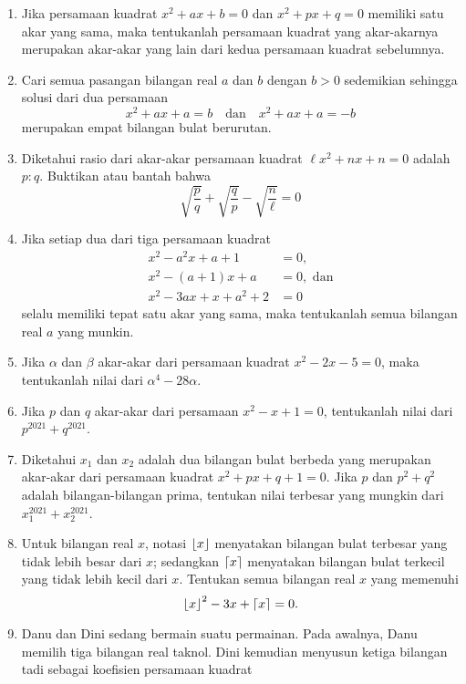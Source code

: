 \begin{enumerate}[nosep]
			\item Jika persamaan kuadrat $ x^{2} + ax + b = 0 $ dan $ x^{2} + px + q = 0 $ memiliki satu akar yang sama, maka tentukanlah persamaan kuadrat yang akar-akarnya merupakan akar-akar yang lain dari kedua persamaan kuadrat sebelumnya.
			\item Cari semua pasangan bilangan real $ a $ dan $ b $ dengan $ b > 0 $ sedemikian sehingga solusi dari dua persamaan
			\[ x^{2} + ax + a = b \quad \mbox{dan} \quad x^{2} + ax + a = -b \]
			merupakan empat bilangan bulat berurutan.
			\item {} Diketahui rasio dari akar-akar persamaan kuadrat $ \ell x^{2} + nx + n = 0 $ adalah $ p : q $. Buktikan atau bantah bahwa
			\[ \sqrt{\frac{p}{q}} + \sqrt{\frac{q}{p}} - \sqrt{\frac{n}{\ell}} = 0 \]
			\item Jika setiap dua dari tiga persamaan kuadrat
			\begin{align*}
				 x^{2} - a^{2}x + a + 1 &= 0, \\
				 x^{2} - \left(a + 1\right)x + a &= 0, \mbox{ dan} \\
				 x^{2} - 3ax + x + a^{2} + 2 &= 0
			\end{align*}
			selalu memiliki tepat satu akar yang sama, maka tentukanlah semua bilangan real $ a $ yang munkin.
			\item Jika $ \alpha $ dan $ \beta $ akar-akar dari persamaan kuadrat $ x^{2} - 2x - 5 = 0 $, maka tentukanlah nilai dari $ \alpha^{4} - 28\alpha $.
			\item Jika $ p $ dan $ q $ akar-akar dari persamaan $ x^{2} - x + 1 = 0 $, tentukanlah nilai dari $ p^{2021} + q^{2021} $.
			\item Diketahui $ x_{1} $ dan $ x_{2} $ adalah dua bilangan bulat berbeda yang merupakan akar-akar dari persamaan kuadrat $ x^{2} + px + q + 1 = 0 $. Jika $ p $ dan $ p^{2} + q^{2} $ adalah bilangan-bilangan prima, tentukan nilai terbesar yang mungkin dari $ x_{1}^{2021} + x_{2}^{2021} $.
			\item \probtype{*} Untuk bilangan real $ x $, notasi $ \mathop{}\!\left\lfloor{x}\right\rfloor $ menyatakan bilangan bulat terbesar yang tidak lebih besar dari $ x $; sedangkan $ \mathop{}\!\left\lceil{x}\right\rceil $ menyatakan bilangan bulat terkecil yang tidak lebih kecil dari $ x $. Tentukan semua bilangan real $ x $ yang memenuhi
			\[ \mathop{}\!\left\lfloor{x}\right\rfloor^{2} - 3x + \mathop{}\!\left\lceil{x}\right\rceil = 0. \]
			\item \probtype{*} Danu dan Dini sedang bermain suatu permainan. Pada awalnya, Danu memilih tiga bilangan real taknol. Dini kemudian menyusun ketiga bilangan tadi sebagai koefisien persamaan kuadrat

\end{enumerate}
